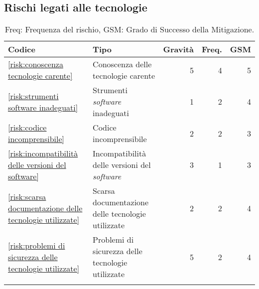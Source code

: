 \subsection{Rischi legati alle tecnologie}
\begin{table}[H]
	\centering

	\begin{tabular}{l|l|r|r|r}
		\hline
		\textbf{Codice}                                                          & \textbf{Tipo} & \textbf{Gravità} & \textbf{Freq.} & \textbf{GSM} \\
		\hline
		\autoref{risk:conoscenza tecnologie carente} 							& Conoscenza delle tecnologie carente     & 5                & 4      &5                                  \\
		\autoref{risk:strumenti software inadeguati} 							& Strumenti \textit{software} inadeguati           & 1                & 2       &4                                   \\
		\autoref{risk:codice incomprensibile} 									& Codice incomprensibile                         & 2                & 2         &3                                 \\
		\autoref{risk:incompatibilità delle versioni del software} 				& Incompatibilità delle versioni del \textit{software}		& 3                & 1       &3                                   \\
		\autoref{risk:scarsa documentazione delle tecnologie utilizzate} 		& Scarsa documentazione delle tecnologie utilizzate	   	 & 2                & 2          &4                                \\
		\autoref{risk:problemi di sicurezza delle tecnologie utilizzate} 		& Problemi di sicurezza delle tecnologie utilizzate	   	 & 5                & 2          &4                               \\
		\hline
		\multicolumn{5}{l}{}                                                                                                                                    \\
	\end{tabular}
	\caption{Freq: Frequenza del rischio, GSM: Grado di Successo della Mitigazione.}
\end{table}








